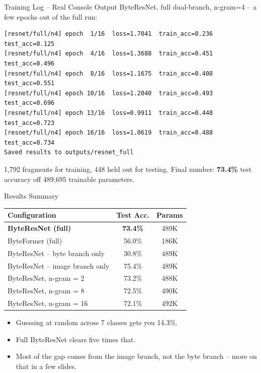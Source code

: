 \documentclass{beamer}
\begin{document}
\begin{frame}[fragile]{Training Log -- Real Console Output}
ByteResNet, full dual-branch, n-gram=4 -- a few epochs out of the full
run:
\begin{lstlisting}[style=term]
[resnet/full/n4] epoch  1/16  loss=1.7041  train_acc=0.236  test_acc=0.125
[resnet/full/n4] epoch  4/16  loss=1.3688  train_acc=0.451  test_acc=0.496
[resnet/full/n4] epoch  8/16  loss=1.1675  train_acc=0.408  test_acc=0.551
[resnet/full/n4] epoch 10/16  loss=1.2040  train_acc=0.493  test_acc=0.696
[resnet/full/n4] epoch 13/16  loss=0.9911  train_acc=0.448  test_acc=0.723
[resnet/full/n4] epoch 16/16  loss=1.0619  train_acc=0.488  test_acc=0.734
Saved results to outputs/resnet_full
\end{lstlisting}
1{,}792 fragments for training, 448 held out for testing. Final number:
\textbf{73.4\%} test accuracy off 489{,}695 trainable parameters.
\end{frame}

\begin{frame}{Results Summary}
\begin{center}
\begin{tabular}{lcc}
\toprule
\textbf{Configuration} & \textbf{Test Acc.} & \textbf{Params} \\
\midrule
\textbf{ByteResNet (full)} & \textbf{73.4\%} & 489K \\
ByteFormer (full) & 56.0\% & 186K \\
ByteResNet -- byte branch only & 30.8\% & 489K \\
ByteResNet -- image branch only & 75.4\% & 489K \\
ByteResNet, n-gram = 2 & 73.2\% & 488K \\
ByteResNet, n-gram = 8 & 72.5\% & 490K \\
ByteResNet, n-gram = 16 & 72.1\% & 492K \\
\bottomrule
\end{tabular}
\end{center}
\vspace{0.5em}
\begin{itemize}
    \item Guessing at random across 7 classes gets you 14.3\%.
    \item Full ByteResNet clears five times that.
    \item Most of the gap comes from the image branch, not the byte
    branch -- more on that in a few slides.
\end{itemize}
\end{frame}
\end{document}
